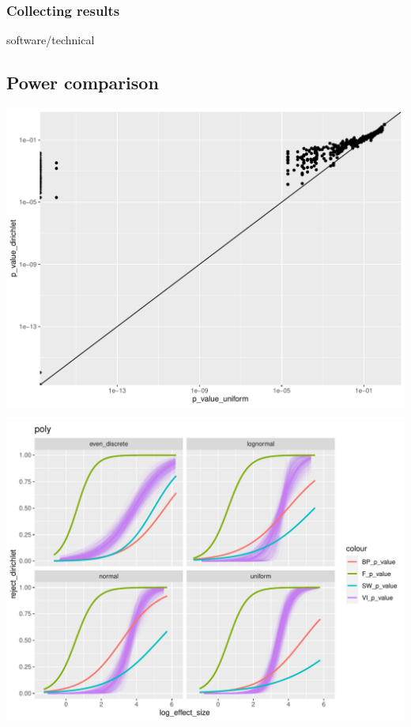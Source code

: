 \documentclass[]{interact}
\theoremstyle{plain}%
\theoremstyle{definition}
\theoremstyle{remark}
\begin{document}
\hypertarget{collecting-results}{%
\subsubsection{Collecting results}\label{collecting-results}}

software/technical

\hypertarget{power-comparison}{%
\subsection{Power comparison}\label{power-comparison}}

\includegraphics[width=1\linewidth]{paper_comparison_files/figure-latex/unnamed-chunk-8-1}

\includegraphics[width=1\linewidth]{paper_comparison_files/figure-latex/unnamed-chunk-9-1}
\end{document}
